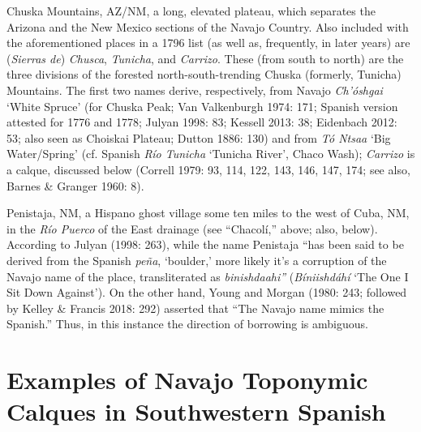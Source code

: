 Chuska Mountains, AZ/NM, a long, elevated plateau, which separates the Arizona and the New Mexico sections of the Navajo Country.  Also included with the aforementioned places in a 1796 list (as well as, frequently, in later years) are (\textit{Sierras de}) \textit{Chusca}, \textit{Tunicha}, and \textit{Carrizo}.  These (from south to north) are the three divisions of the forested north-south-trending Chuska (formerly, Tunicha) Mountains.  The first two names derive, respectively, from Navajo \textit{Ch'óshgai} ‘White Spruce’ (for Chuska Peak; Van Valkenburgh 1974: 171; Spanish version attested for 1776 and 1778; Julyan 1998: 83; Kessell 2013: 38; Eidenbach 2012: 53; also seen as Choiskai Plateau; Dutton 1886: 130) and from \textit{Tó Ntsaa} ‘Big Water/Spring’ (cf. Spanish \textit{Río Tunicha} ‘Tunicha River’, Chaco Wash); \textit{Carrizo} is a calque, discussed below (Correll 1979: 93, 114, 122, 143, 146, 147, 174; see also, Barnes \& Granger 1960: 8).

Penistaja, NM, a Hispano ghost village some ten miles to the west of Cuba, NM, in the \textit{Río Puerco} of the East drainage (see “Chacolí,” above; also, below).  According to Julyan (1998: 263), while the name Penistaja “has been said to be derived from the Spanish \textit{peña}, ‘boulder,’ more likely it’s a corruption of the Navajo name of the place, transliterated as \textit{binishdaahi” }(\textit{Bíniishdáhí }‘The One I Sit Down Against’).  On the other hand, Young and Morgan (1980: 243; followed by Kelley \& Francis 2018: 292) asserted that “The Navajo name mimics the Spanish.”  Thus, in this instance the direction of borrowing is ambiguous.


\section{Examples of Navajo Toponymic Calques in Southwestern Spanish}\label{jett:sec:4}

